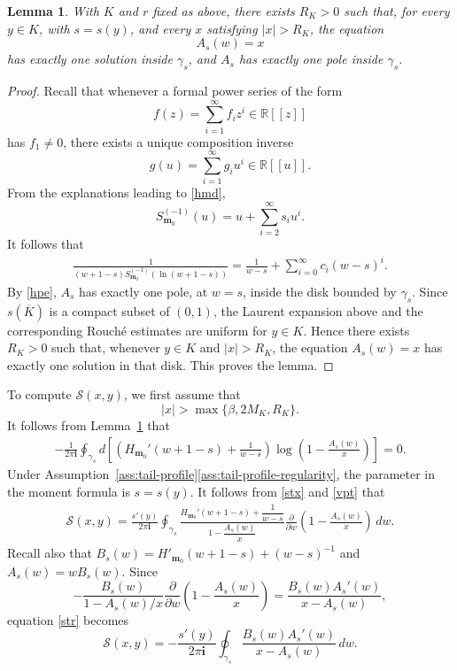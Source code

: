 \documentclass[11pt]{amsart}
\theoremstyle{plain}
\newtheorem{lemma}[theorem]{Lemma}
\newcommand\RR{{\mathbb R}}
\newcommand\bm{\mathbf{m}}
\numberwithin{equation}{section}
\numberwithin{theorem}{section}
\numberwithin{figure}{section}
\begin{document}
\begin{lemma}\label{l31}
With $K$ and $r$ fixed as above, there exists $R_K>0$ such that, for
every $y\in K$, with $s=s(y)$, and every $x$ satisfying $|x|>R_K$, the
equation
\[
    A_s(w)=x
\]
has exactly one solution inside $\gamma_s$, and $A_s$ has exactly one
pole inside $\gamma_s$.
\end{lemma}

\begin{proof}
Recall that whenever a formal power series of the form
\[
    f(z)=\sum_{i=1}^{\infty}f_i z^i\in\RR[[z]]
\]
has $f_1\neq0$, there exists a unique composition inverse
\[
    g(u)=\sum_{i=1}^{\infty}g_i u^i\in\RR[[u]].
\]
From the explanations leading to \eqref{hmd},
\[
    S_{\mathbf m_0}^{(-1)}(u)
    =
    u+\sum_{i=2}^{\infty}s_i u^i.
\]
It follows that
\begin{align}
\frac{1}{
(w+1-s)S_{\bm_0}^{(-1)}(\ln(w+1-s))
}
=
\frac{1}{w-s}
+\sum_{i=0}^{\infty}c_i(w-s)^i.
\label{sip}
\end{align}
By \eqref{hpe}, $A_s$ has exactly one pole, at $w=s$, inside the disk
bounded by $\gamma_s$. Since $s(\overline K)$ is a compact subset of
$(0,1)$, the Laurent expansion above and the corresponding Rouch\'e
estimates are uniform for $y\in K$. Hence there exists $R_K>0$ such
that, whenever $y\in K$ and $|x|>R_K$, the equation $A_s(w)=x$ has
exactly one solution in that disk. This proves the lemma.
\end{proof}

To compute $\mathcal S(x,y)$, we first assume that
\[
    |x|>\max\{\beta,2M_K,R_K\}.
\]
It follows from Lemma~\ref{l31} that
\begin{align}
-\frac{1}{2\pi\mathbf i}
\oint_{\gamma_s}
 d\left[
 \left(
 H_{\mathbf m_0}'(w+1-s)
 +\frac{1}{w-s}
 \right)
 \log\left(1-\frac{A_s(w)}{x}\right)
 \right]
=0.
\label{vpt}
\end{align}
Under Assumption~\ref{ass:tail-profile}\ref{ass:tail-profile-regularity}, the parameter in the moment formula
is $s=s(y)$. It follows from \eqref{stx} and \eqref{vpt} that
\begin{align}
\mathcal S(x,y)
=
\frac{s'(y)}{2\pi\mathbf i}
\oint_{\gamma_s}
\frac{
 H_{\mathbf m_0}'(w+1-s)+\dfrac{1}{w-s}
}{
 1-\dfrac{A_s(w)}{x}
}
\frac{\partial}{\partial w}
\left(1-\frac{A_s(w)}{x}\right)
\,dw.
\label{str}
\end{align}
Recall also that $B_s(w)=H'_{\mathbf m_0}(w+1-s)+(w-s)^{-1}$ and
$A_s(w)=wB_s(w)$.
Since
\[
    -\frac{B_s(w)}{1-A_s(w)/x}
    \frac{\partial}{\partial w}
    \left(
        1-\frac{A_s(w)}{x}
    \right)
    =
    \frac{B_s(w)A_s'(w)}{x-A_s(w)},
\]
equation \eqref{str} becomes
\begin{equation}
    \mathcal S(x,y)
    =
    -\frac{s'(y)}{2\pi\mathbf i}
    \oint_{\gamma_s}
    \frac{B_s(w)A_s'(w)}
         {x-A_s(w)}
    \,dw.
    \label{eq:st-xi-residue-form}
\end{equation}
\end{document}
